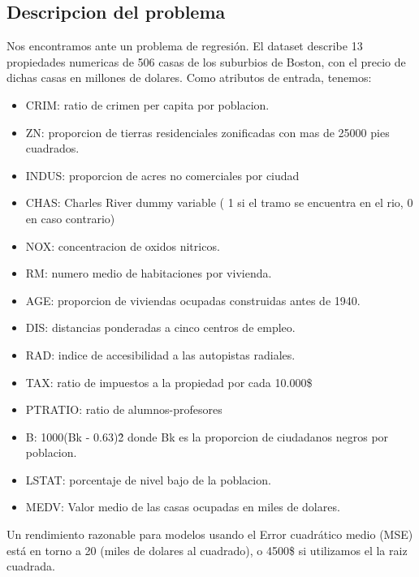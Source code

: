 \subsection{Descripcion del problema}
Nos encontramos ante un problema de regresión. El dataset describe 13 propiedades numericas de 506 casas de los suburbios de Boston, con el precio de dichas casas en millones de dolares. Como atributos de entrada, tenemos:
\begin{itemize}[noitemsep]
\item CRIM:  ratio de crimen per capita por poblacion.
\item ZN: proporcion de tierras residenciales zonificadas con mas de 25000 pies cuadrados.
\item INDUS: proporcion de acres no comerciales por ciudad
\item CHAS: Charles River dummy variable ( 1 si el tramo se encuentra en el rio, 0 en caso contrario) 
\item NOX: concentracion de oxidos nitricos.
\item RM: numero medio de habitaciones por vivienda.
\item AGE: proporcion de viviendas ocupadas construidas antes de 1940.
\item DIS: distancias ponderadas a cinco centros de empleo.
\item RAD: indice de accesibilidad a las autopistas radiales.
\item TAX: ratio de impuestos a la propiedad por cada 10.000\$ 
\item PTRATIO: ratio de alumnos-profesores
\item B: 1000(Bk - 0.63)\^2 donde Bk es la proporcion de ciudadanos negros por poblacion.
\item LSTAT: porcentaje de nivel bajo de la poblacion.
\item MEDV: Valor medio de las casas ocupadas en miles de dolares.
\end{itemize}
Un rendimiento razonable para modelos usando el Error cuadrático medio (MSE) está en torno a 20 (miles de dolares al cuadrado), o 4500\$ si utilizamos el la raiz cuadrada.
